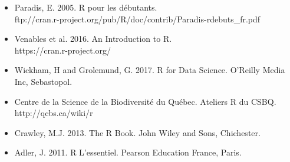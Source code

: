 \documentclass[12]{article}
\begin{document}
	\begin{itemize}
	\renewcommand{\labelitemi}{$\bullet$}

		\item Paradis, E. 2005. R pour les débutants.
		\\ ftp://cran.r-project.org/pub/R/doc/contrib/Paradis-rdebuts\_fr.pdf

		\item Venables et al. 2016. An Introduction to R.
		\\ https://cran.r-project.org/

		\item Wickham, H and Grolemund, G. 2017. R for Data Science. O'Reilly Media Inc, Sebastopol.

		\item Centre de la Science de la Biodiversité du Québec. Ateliers R du CSBQ. \\ http://qcbs.ca/wiki/r

		\item Crawley, M.J. 2013. The R Book. John Wiley and Sons, Chichester.

		\item Adler, J. 2011. R L'essentiel. Pearson Education France, Paris.

	\end{itemize}
\end{document}
